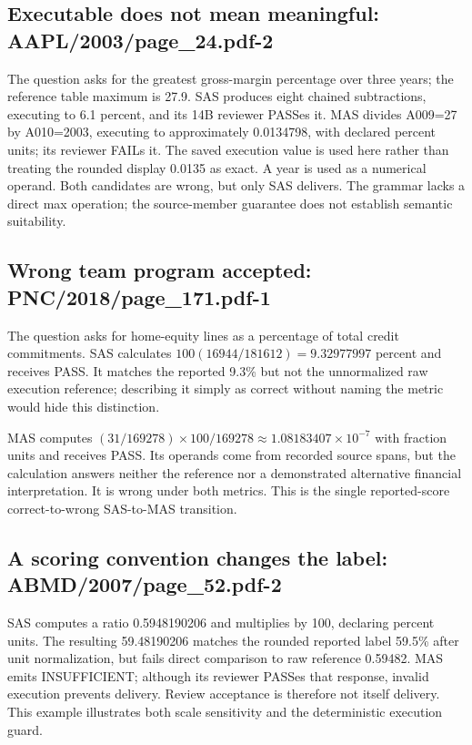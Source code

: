 \subsection{Executable does not mean meaningful: AAPL/2003/page\_24.pdf-2}
The question asks for the greatest gross-margin percentage over three years; the reference table maximum is 27.9. SAS produces eight chained subtractions, executing to 6.1 percent, and its 14B reviewer PASSes it. MAS divides A009=27 by A010=2003, executing to approximately 0.0134798, with declared percent units; its reviewer FAILs it. The saved execution value is used here rather than treating the rounded display 0.0135 as exact. A year is used as a numerical operand. Both candidates are wrong, but only SAS delivers. The grammar lacks a direct max operation; the source-member guarantee does not establish semantic suitability.

\subsection{Wrong team program accepted: PNC/2018/page\_171.pdf-1}
The question asks for home-equity lines as a percentage of total credit commitments. SAS calculates $100(16944/181612)=9.32977997$ percent and receives PASS. It matches the reported 9.3\% but not the unnormalized raw execution reference; describing it simply as correct without naming the metric would hide this distinction.

MAS computes $(31/169278)\times100/169278\approx1.08183407\times10^{-7}$ with fraction units and receives PASS. Its operands come from recorded source spans, but the calculation answers neither the reference nor a demonstrated alternative financial interpretation. It is wrong under both metrics. This is the single reported-score correct-to-wrong SAS-to-MAS transition.

\subsection{A scoring convention changes the label: ABMD/2007/page\_52.pdf-2}
SAS computes a ratio 0.5948190206 and multiplies by 100, declaring percent units. The resulting 59.48190206 matches the rounded reported label 59.5\% after unit normalization, but fails direct comparison to raw reference 0.59482. MAS emits INSUFFICIENT; although its reviewer PASSes that response, invalid execution prevents delivery. Review acceptance is therefore not itself delivery. This example illustrates both scale sensitivity and the deterministic execution guard.

